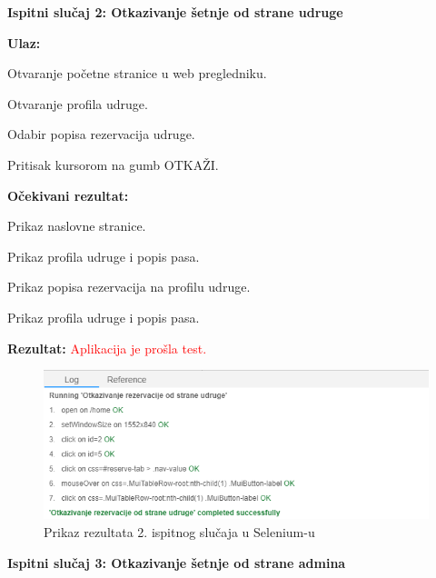 			\noindent \textbf{Ispitni slučaj 2: Otkazivanje šetnje od strane udruge}
			
			\noindent \textbf{Ulaz:}
			\begin{packed_enum}
				
				\item Otvaranje početne stranice u web pregledniku.
				\item Otvaranje profila udruge.
				\item Odabir popisa rezervacija udruge.
				\item Pritisak kursorom na gumb OTKAŽI.
				
			\end{packed_enum}
			\textbf{Očekivani rezultat:}
			\begin{packed_enum}
				
				\item Prikaz naslovne stranice.
				\item Prikaz profila udruge i popis pasa.
				\item Prikaz popisa rezervacija na profilu udruge.
				\item Prikaz profila udruge i popis pasa.
				
			\end{packed_enum}
			\textbf{Rezultat:} \textcolor{red}{Aplikacija je prošla test.}
			
			\begin{figure}[H]
				\includegraphics[scale=0.7]{slike/otkazivanjeRezervacijeOdStraneUdruge.PNG} 
				\centering
				\caption{Prikaz rezultata 2. ispitnog slučaja u Selenium-u}
				\label{fig:sustav-drugi-slucaj}
			\end{figure}
		
			\noindent \textbf{Ispitni slučaj 3: Otkazivanje šetnje od strane admina}
			
